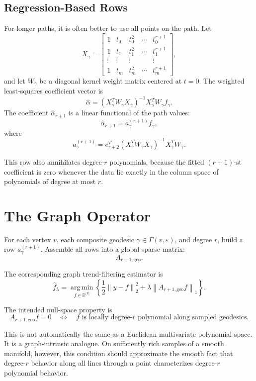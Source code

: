 \documentclass[11pt]{article}
\newcommand{\R}{\mathbb R}
\newcommand{\norm}[1]{\left\lVert #1 \right\rVert}
\newcommand{\argmin}{\operatorname*{arg\,min}}
\newcommand{\Geo}{\Gamma}
\newcommand{\eps}{\varepsilon}
\begin{document}
\subsection{Regression-Based Rows}

For longer paths, it is often better to use all points on the path.  Let
\[
  X_\gamma =
  \begin{bmatrix}
  1 & t_0 & t_0^2 & \cdots & t_0^{r+1}\\
  1 & t_1 & t_1^2 & \cdots & t_1^{r+1}\\
  \vdots & \vdots & \vdots & & \vdots\\
  1 & t_m & t_m^2 & \cdots & t_m^{r+1}
  \end{bmatrix},
\]
and let \(W_\gamma\) be a diagonal kernel weight matrix centered at \(t=0\).
The weighted least-squares coefficient vector is
\[
  \widehat\alpha
  =
  (X_\gamma^T W_\gamma X_\gamma)^{-1}X_\gamma^TW_\gamma f_\gamma.
\]
The coefficient \(\widehat\alpha_{r+1}\) is a linear functional of the path
values:
\[
  \widehat\alpha_{r+1}
  =
  a_{\gamma}^{(r+1)} f_\gamma,
\]
where
\[
  a_{\gamma}^{(r+1)}
  =
  e_{r+2}^T
  (X_\gamma^T W_\gamma X_\gamma)^{-1}
  X_\gamma^T W_\gamma.
\]

This row also annihilates degree-\(r\) polynomials, because the fitted
\((r+1)\)-st coefficient is zero whenever the data lie exactly in the column
space of polynomials of degree at most \(r\).

\section{The Graph Operator}

For each vertex \(v\), each composite geodesic \(\gamma\in\Geo(v,\eps)\), and
degree \(r\), build a row \(a_{\gamma}^{(r+1)}\).  Assemble all rows into a
global sparse matrix:
\[
  A_{r+1,\mathrm{geo}}.
\]

The corresponding graph trend-filtering estimator is
\[
  \widehat f_\lambda
  =
  \argmin_{f\in\R^{|V|}}
  \left\{
  \frac12\norm{y-f}_2^2
  +
  \lambda\norm{A_{r+1,\mathrm{geo}}f}_1
  \right\}.
\]

The intended null-space property is
\[
  A_{r+1,\mathrm{geo}}f=0
  \quad\Longleftrightarrow\quad
  f \text{ is locally degree-\(r\) polynomial along sampled geodesics.}
\]

This is not automatically the same as a Euclidean multivariate polynomial
space.  It is a graph-intrinsic analogue.  On sufficiently rich samples of a
smooth manifold, however, this condition should approximate the smooth fact
that degree-\(r\) behavior along all lines through a point characterizes
degree-\(r\) polynomial behavior.
\end{document}
